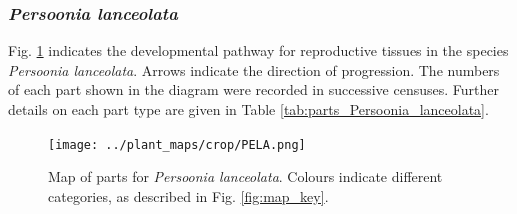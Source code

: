 \documentclass[10pt,twoside]{article}\usepackage[]{graphicx}\usepackage[]{color}
\begin{document}
\clearpage

\subsubsection{\emph{Persoonia lanceolata}}

Fig. \ref{fig:map_Persoonia_lanceolata} indicates the developmental pathway for reproductive tissues in the species \emph{Persoonia lanceolata}. Arrows indicate the direction of progression.  The numbers of each part shown in the diagram were recorded in successive censuses. Further details on each part type are given in Table \ref{tab:parts_Persoonia_lanceolata}.

\begin{figure}[h]
\centering
\texttt{[image: ../plant\_maps/crop/PELA.png]}
\caption{Map of parts for \emph{Persoonia lanceolata}. Colours indicate different categories, as described in Fig. \ref{fig:map_key}.}
\label{fig:map_Persoonia_lanceolata}
\end{figure}

\clearpage
\end{document}
